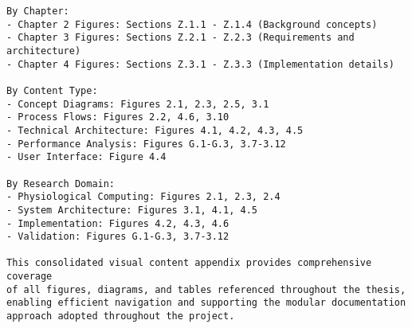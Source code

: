 \begin{verbatim}
By Chapter:
- Chapter 2 Figures: Sections Z.1.1 - Z.1.4 (Background concepts)
- Chapter 3 Figures: Sections Z.2.1 - Z.2.3 (Requirements and architecture)
- Chapter 4 Figures: Sections Z.3.1 - Z.3.3 (Implementation details)

By Content Type:
- Concept Diagrams: Figures 2.1, 2.3, 2.5, 3.1
- Process Flows: Figures 2.2, 4.6, 3.10
- Technical Architecture: Figures 4.1, 4.2, 4.3, 4.5
- Performance Analysis: Figures G.1-G.3, 3.7-3.12
- User Interface: Figure 4.4

By Research Domain:
- Physiological Computing: Figures 2.1, 2.3, 2.4
- System Architecture: Figures 3.1, 4.1, 4.5
- Implementation: Figures 4.2, 4.3, 4.6
- Validation: Figures G.1-G.3, 3.7-3.12

This consolidated visual content appendix provides comprehensive coverage
of all figures, diagrams, and tables referenced throughout the thesis,
enabling efficient navigation and supporting the modular documentation
approach adopted throughout the project.
\end{verbatim}
